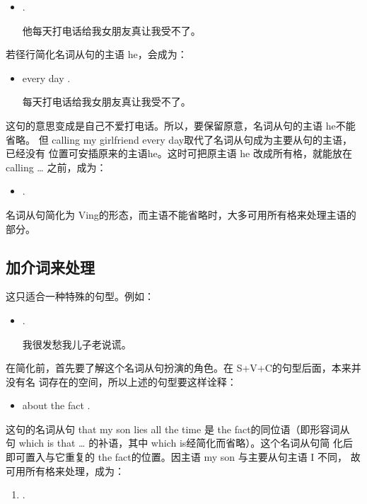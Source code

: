 \begin{itemize}
\item {} 
  .

  他每天打电话给我女朋友真让我受不了。
\end{itemize}
若径行简化名词从句的主语 he，会成为：
\begin{itemize}
\item {} every day  .

  每天打电话给我女朋友真让我受不了。
\end{itemize}
这句的意思变成是自己不爱打电话。所以，要保留原意，名词从句的主语 he不能省略。
但 calling my girlfriend every day取代了名词从句成为主要从句的主语，已经没有
位置可安插原来的主语he。这时可把原主语 he 改成所有格，就能放在 calling
\ldots{} 之前，成为：
\begin{itemize}
\item {} 
  .
\end{itemize}

名词从句简化为 Ving的形态，而主语不能省略时，大多可用所有格来处理主语的部分。

\subsection{加介词来处理}

这只适合一种特殊的句型。例如：
\begin{itemize}
\item {}   .

  我很发愁我儿子老说谎。
\end{itemize}
在简化前，首先要了解这个名词从句扮演的角色。在 S+V+C的句型后面，本来并没有名
词存在的空间，所以上述的句型要这样诠释：
\begin{itemize}
\item {}   about the fact .
\end{itemize}
这句的名词从句 that my son lies all the time 是 the fact的同位语（即形容词从
句 which is that \ldots{} 的补语，其中 which is经简化而省略）。这个名词从句简
化后即可置入与它重复的 the fact的位置。因主语 my son 与主要从句主语 I 不同，
故可用所有格来处理，成为：
\begin{enumerate}
\item {}    .
\end{enumerate}

